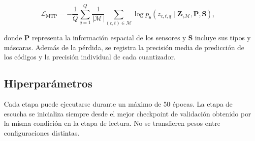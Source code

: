 \begin{equation}
\mathcal{L}_{\mathrm{MTP}} =
-\frac{1}{Q}
\sum_{q=1}^{Q}
\frac{1}{|\mathcal{M}|}
\sum_{(c,t)\in\mathcal{M}}
\log
p_{\theta}
\left(
z_{c,t,q}
\mid
\mathbf{Z}_{\setminus\mathcal{M}},
\mathbf{P},
\mathbf{S}
\right),
\end{equation}

\noindent donde \(\mathbf{P}\) representa la información espacial de los sensores y \(\mathbf{S}\) incluye sus tipos y máscaras. Además de la pérdida, se registra la precisión media de predicción de los códigos y la precisión individual de cada cuantizador.

\subsection{Hiperparámetros}

Cada etapa puede ejecutarse durante un máximo de 50 épocas. La etapa de escucha se inicializa siempre desde el mejor checkpoint de validación obtenido por la misma condición en la etapa de lectura. No se transfieren pesos entre configuraciones distintas.

